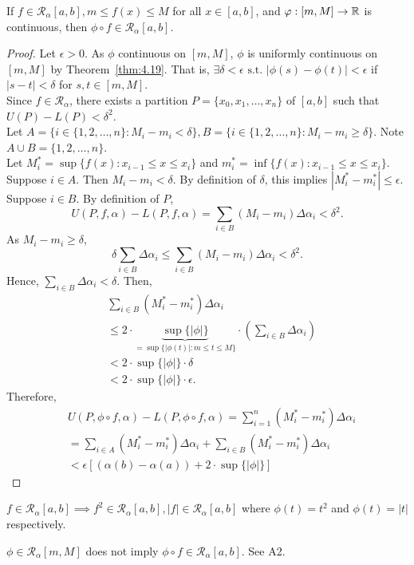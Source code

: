 \begin{thm}[11]
	If $f \in \mathscr{R}_{\alpha}[a,b], m \le f(x)\le M$ for all $x \in [a,b]$, and $\varphi:[m,M]\to \mathbb{R}$ is continuous, then $\phi \circ f \in \mathscr{R}_{\alpha}[a,b]$.
	\begin{proof}
		Let $\epsilon>0$. As $\phi$ continuous on $[m,M]$, $\phi$ is uniformly continuous on $[m,M]$ by Theorem~\ref{thm:4.19}.
		That is, $\exists{\delta < \epsilon} \text{ s.t. } |\phi(s)-\phi(t)|<\epsilon$ if $|s-t|<\delta$ for $s,t \in [m,M]$.\\
		Since $f \in \mathscr{R}_{\alpha}$, there exists a partition $P=\{x_0,x_1,\ldots ,x_n\}$ of $[a,b]$ such that $U(P)-L(P)<\delta^2$.\\
		Let $A=\{i \in \{1,2,\ldots ,n\}: M_i -m_i < \delta\}, B=\{i \in \{1,2,\ldots ,n\}: M_i -m_i \ge  \delta\}$.
		Note $A \cup B=\{1,2,\ldots ,n\}$.
		\\
		Let $M^{*}_i=\sup\{f(x):x_{i-1}\le x\le x_i\}$ and $m^{*}_i=\inf\{f(x):x_{i-1}\le x\le x_i\}$.
		Suppose $i \in A$. Then $M_i-m_i<\delta$. By definition of $\delta$, this implies $|M^{*}_i-m^{*}_i|\le \epsilon$.\\
		Suppose $i \in B$.
		By definition of $P$,
		\[
			U(P,f,\alpha)-L(P,f,\alpha)=\sum_{i \in B}{(M_i-m_i)\Delta \alpha_i}<\delta ^2.
		\]
		As $M_i-m_i\ge \delta$,
		\[
			\delta \sum_{i \in B}{\Delta \alpha_i}\le \sum_{i \in B}{(M_i-m_i)\Delta \alpha_i}<\delta ^2
			.\]
		Hence, $\sum_{i \in B}{\Delta \alpha_i}<\delta$. Then,
		\begin{align*}
			 & \sum_{i \in B}{(M^{*}_i-m^{*}_i)\Delta \alpha_i}                                                                            \\
			 & \le 2 \cdot \underbrace{\sup\{|\phi|\}}_{=\sup\{|\phi(t)|: m\le t\le M\}} \cdot \left(\sum_{i \in B}{\Delta\alpha_i}\right) \\
			 & < 2\cdot \sup\{|\phi|\} \cdot \delta                                                                                        \\
			 & <2 \cdot \sup\{|\phi|\} \cdot \epsilon.
		\end{align*}
		Therefore,
		\begin{align*}
			 & U(P,\phi \circ f,\alpha)-L(P,\phi \circ f,\alpha)=\sum_{i=1}^{n}{(M^{*}_i-m^{*}_i)\Delta \alpha_i} \\
			 & =\sum_{i \in A}{(M^{*}_i-m^{*}_i)\Delta \alpha_i}+\sum_{i \in B}{(M^{*}_i-m^{*}_i)\Delta \alpha_i} \\
			 & < \epsilon[(\alpha(b)-\alpha(a)) + 2 \cdot \sup\{|\phi|\}]
		\end{align*}

	\end{proof}
	\begin{example}
		$f \in \mathscr{R}_{\alpha}[a,b]\implies f^2 \in \mathscr{R}_{\alpha}[a,b], |f| \in \mathscr{R}_{\alpha}[a,b]$ where $\phi(t)=t^2$ and $\phi(t)=|t|$ respectively.
	\end{example}
	\begin{note}
		$\phi \in \mathscr{R}_{\alpha}[m,M]$ does not imply $\phi \circ f \in \mathscr{R}_{\alpha}[a,b]$. See A2.
	\end{note}
\end{thm}

